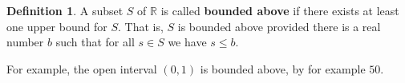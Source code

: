 \documentclass[12pt]{amsart}
\newcommand{\R}{{\mathbb{R}}}
\numberwithin{equation}{section}
\theoremstyle{plain} %
\newtheorem{prop}[equation]{Proposition}
\theoremstyle{definition}
\newtheorem{defn}[equation]{Definition}
\theoremstyle{remark}
\begin{document}
%
%
%
%
%
%
%
%
%


\begin{defn} A subset $S$ of $\R$ is called \textbf{bounded above} if there exists at least one upper bound for $S$. That is, $S$ is bounded above provided there
  is a real number $b$ such that for all $s \in S$ we have $s \leq b$.
\end{defn}

For example, the open interval $(0,1)$ is bounded above, by for example $50$.  
\end{document}
